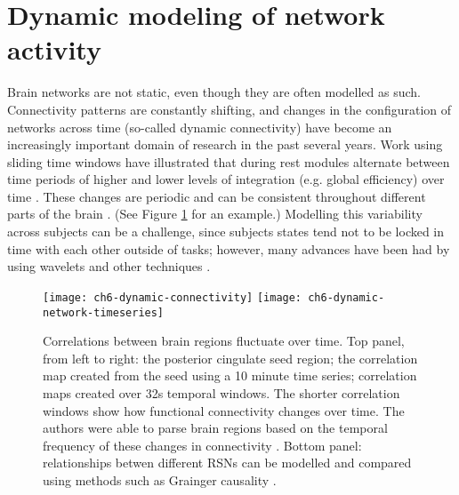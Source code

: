 \section{Dynamic modeling of network activity}

Brain networks are not static, even though they are often modelled as such. Connectivity patterns are constantly shifting, and changes in the configuration of networks across time (so-called dynamic connectivity) have become an increasingly important domain of research in the past several years. Work using sliding time windows have illustrated that during rest modules alternate between time periods of higher and lower levels of integration (e.g. global efficiency) over time \citep{Zalesky2014}. These changes are periodic and can be consistent throughout different parts of the brain \citep{Handwerker2012}. (See Figure \ref{fig:ch6-dynamic-connectivity} for an example.) Modelling this variability across subjects can be a challenge, since subjects states tend not to be locked in time with each other outside of tasks; however, many advances have been had by using wavelets and other techniques \citep{Zalesky2014}. 

\begin{figure}[t!]
	\centering
	\texttt{[image: ch6-dynamic-connectivity]}
	\texttt{[image: ch6-dynamic-network-timeseries]}

	\caption[Correlations between brain regions fluctuate over time]{Correlations between brain regions fluctuate over time. Top panel, from left to right: the posterior cingulate seed region; the correlation map created from the seed using a 10 minute time series; correlation maps created over 32s temporal windows. The shorter correlation windows show how functional connectivity changes over time. The authors were able to parse brain regions based on the temporal frequency of these changes in connectivity \citep{Handwerker2012}. Bottom panel: relationships betwen different RSNs can be modelled and compared using methods such as Grainger causality \citep{Havlicek2010}.}
	\label{fig:ch6-dynamic-connectivity}
\end{figure}

